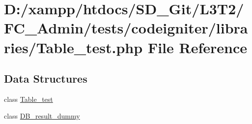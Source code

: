 \hypertarget{_table__test_8php}{}\section{D\+:/xampp/htdocs/\+S\+D\+\_\+\+Git/\+L3\+T2/\+F\+C\+\_\+\+Admin/tests/codeigniter/libraries/\+Table\+\_\+test.php File Reference}
\label{_table__test_8php}
\subsection*{Data Structures}
\begin{DoxyCompactItemize}
\item 
class \hyperlink{class_table__test}{Table\+\_\+test}
\item 
class \hyperlink{class_d_b__result__dummy}{D\+B\+\_\+result\+\_\+dummy}
\end{DoxyCompactItemize}
